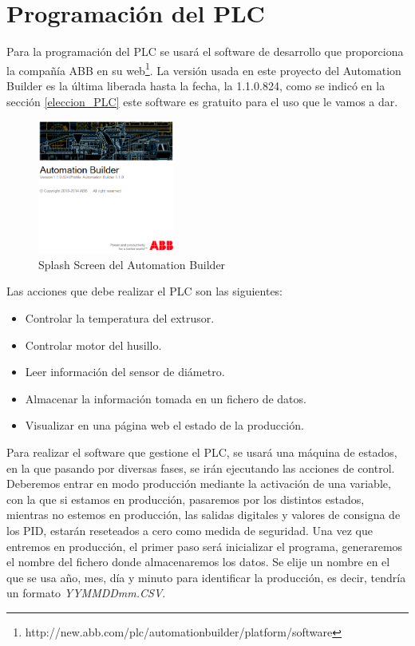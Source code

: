 \section{Programación del PLC}
\label{sec:program.plc}

Para la programación del PLC se usará el software de desarrollo que proporciona la compañía ABB en su web\footnote{http://new.abb.com/plc/automationbuilder/platform/software}. La versión usada en este proyecto del Automation Builder es la última liberada hasta la fecha, la 1.1.0.824, como se indicó en la sección \ref{eleccion_PLC} este software es gratuito para el uso que le vamos a dar.\\
    \begin{figure}[H]
            \centering
            \includegraphics[width=0.4\textwidth]{images/PLC/ABB.png}
            \caption{Splash Screen del Automation Builder}
            \label{fig:PLC_splashabb}
    \end{figure}
Las acciones que debe realizar el PLC son las siguientes:

\begin{itemize}
	\item{Controlar la temperatura del extrusor.}
	\item{Controlar motor del husillo.}
	\item{Leer información del sensor de diámetro.}
	\item{Almacenar la información tomada en un fichero de datos.}
	\item{Visualizar en una página web el estado de la producción.}
\end{itemize}

Para realizar el software que gestione el PLC, se usará una máquina de estados, en la que pasando por diversas fases, se irán ejecutando las acciones de control. Deberemos entrar en modo producción mediante la activación de una variable, con la que si estamos en producción, pasaremos por los distintos estados, mientras no estemos en producción, las salidas digitales y valores de consigna de los PID, estarán reseteados a cero como medida de seguridad. Una vez que entremos en producción, el primer paso será inicializar el programa, generaremos el nombre del fichero donde almacenaremos los datos. Se elije un nombre en el que se usa año, mes, día y minuto para identificar la producción, es decir, tendría un formato \textit{YYMMDDmm.CSV}.\\

